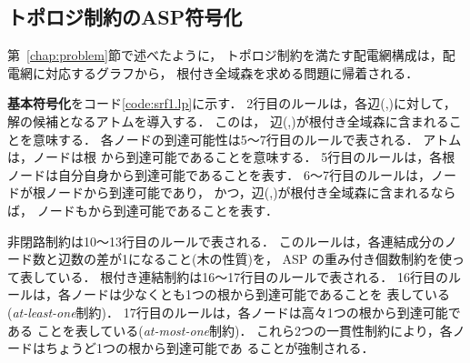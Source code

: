 \begin{itemize}
\end{itemize}


\subsection{トポロジ制約のASP符号化}\label{chap:topology}





第~\ref{chap:problem}節で述べたように，
トポロジ制約を満たす配電網構成は，配電網に対応するグラフから，
根付き全域森を求める問題に帰着される．

\textbf{基本符号化}をコード\ref{code:srf1.lp}に示す．
2行目のルールは，各辺(,)に対して，
解の候補となるアトムを導入する．
このは，
辺(,)が根付き全域森に含まれることを意味する．
%
各ノードの到達可能性は5～7行目のルールで表される．
アトムは，ノードは根
から到達可能であることを意味する．
5行目のルールは，各根ノードは自分自身から到達可能であることを表す．
6～7行目のルールは，ノードが根ノードから到達可能であり，
かつ，辺(,)が根付き全域森に含まれるならば，
ノードもから到達可能であることを表す．

非閉路制約は10～13行目のルールで表される．
このルールは，各連結成分のノード数と辺数の差が1になること(木の性質)を，
ASP の重み付き個数制約を使って表している．
%
根付き連結制約は16～17行目のルールで表される．
16行目のルールは，各ノードは少なくとも1つの根から到達可能であることを
表している(\textit{at-least-one}制約)．
17行目のルールは，各ノードは高々1つの根から到達可能である
ことを表している(\textit{at-most-one}制約)．
これら2つの一貫性制約により，各ノードはちょうど1つの根から到達可能であ
ることが強制される．

